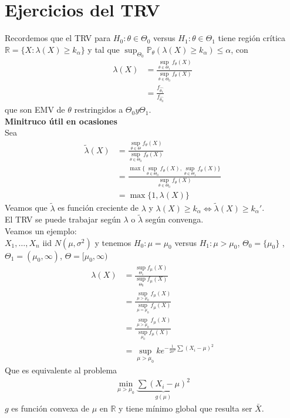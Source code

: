 \documentclass[10pt]{article}
\theoremstyle{plain}
\theoremstyle{definition}
\begin{document}
\section{Ejercicios del TRV}
Recordemos que el TRV para $H_{0}: \theta \in \Theta_{0}$ versus $H_{1}: \theta \in \Theta_{1}$ tiene región crítica $\mathbb{R}=\{X \colon \lambda(X) \ge k_{\alpha}\}$ y tal que $\sup_{\Theta_{0}}\mathbb{P}_{\theta}(\lambda(X) \ge k_{\alpha})\le \alpha$, con 
\begin{align*}
\lambda(X) &= \frac{\sup_{\theta \in \Theta_{1}}f_{\theta}(X)}{\sup_{\theta \in \Theta_{0}}f_{\theta}(X)}\\
&= \frac{f_{\hat{\theta_{1}}}}{f_{\hat{\theta_{0}}}}
\end{align*}
que son EMV de $\theta$ restringidos a $\Theta_{0} y \Theta_{1}$.\\
\textbf{Minitruco útil en ocasiones}\\

Sea
\begin{align*}
\tilde{\lambda}(X) &= \frac{\sup_{\theta \in \Theta}f_{\theta}(X)}{\sup_{\theta \in \Theta_{0}}f_{\theta}(X)}\\
&= \frac{\max\{\sup_{\theta \in \Theta_{0}}f_{\theta}(X),\sup_{\theta \in \Theta_{1}}f_{\theta}(X)\}}{\sup_{\theta \in \Theta_{0}}f_{\theta}(X)}\\
&= \max\{1,\lambda(X)\}
\end{align*}
Veamos que $\tilde{\lambda}$ es función creciente de $\lambda$ y $\lambda(X) \ge k_{\alpha} \Leftrightarrow \tilde{\lambda}(X) \ge k_{\alpha}'$.\\
El TRV se puede trabajar según $\lambda$ o $\tilde{\lambda}$ según convenga.\\

Veamos un ejemplo:\\
$X_{1},\ldots,X_{n}$ iid $N(\mu,\sigma^2)$ y tenemos $H_{0}: \mu=\mu_{0}$ versus $H_{1}: \mu > \mu_{0}$, $\Theta_{0}=\{\mu_{0}\}$ , $\Theta_{1}=(\mu_{0},\infty)$, $\Theta = [\mu_{0},\infty)$
\begin{align*}
\lambda(X) &= \frac{\sup_{\Theta_{1}}f_{\mu}(X)}{\sup_{\Theta_{0}}f_{\mu}(X)}\\
&= \frac{\sup_{\mu>\mu_{0}}f_{\mu}(X)}{\sup_{\mu =\mu_{0}}f_{\mu}(X)}\\
&= \frac{\sup_{\mu>\mu_{0}}f_{\mu}(X)}{\sup_{\mu_{0}}f_{\mu}(X)}\\
&= \sup_{\mu > \mu_{0}} k e^{-\frac{1}{2\sigma^2}\sum(X_{i}-\mu)^2}
\end{align*}
Que es equivalente al problema
\begin{align*}
\min_{\mu>\mu_{0}} \underbrace{\sum(X_{i}-\mu)^2}_{g(\mu)}
\end{align*}
$g$ es función convexa de $\mu$ en $\mathbb{R}$ y tiene mínimo global que resulta ser $\bar{X}$.\\
\end{document}
